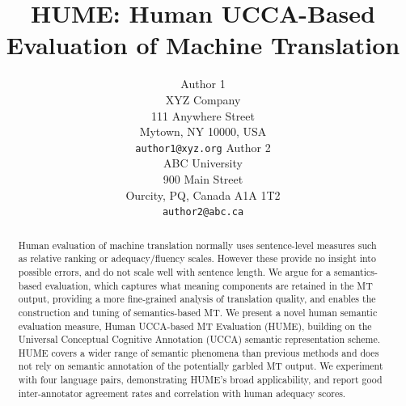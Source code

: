 \documentclass[11pt,letterpaper]{article}
\title{HUME: Human UCCA-Based Evaluation of Machine Translation}
\author{Author 1\\
	    XYZ Company\\
	    111 Anywhere Street\\
	    Mytown, NY 10000, USA\\
	    {\tt author1@xyz.org}
	  \And
	Author 2\\
  	ABC University\\
  	900 Main Street\\
  	Ourcity, PQ, Canada A1A 1T2\\
  {\tt author2@abc.ca}}
\date{}
\begin{document}
\maketitle

\begin{abstract}
  

Human evaluation of machine translation normally uses sentence-level measures such as relative ranking
or adequacy/fluency scales. However these provide no insight into possible errors,
and do not scale well with sentence length.
We argue for a semantics-based evaluation, which captures what meaning components
are retained in the MT output, providing a more fine-grained analysis of
translation quality, and enables the construction and tuning of semantics-based MT. 
We present a novel human semantic evaluation measure, Human
UCCA-based MT Evaluation (HUME), building on the Universal Conceptual Cognitive Annotation (UCCA)
semantic representation scheme.
HUME covers
a wider range of semantic phenomena than previous methods and does not rely on semantic annotation
of the potentially garbled MT output. 
We experiment with four language pairs, demonstrating HUME's broad applicability,
and report good
inter-annotator agreement rates and 
 correlation with human adequacy scores.



\end{abstract}
\end{document}
